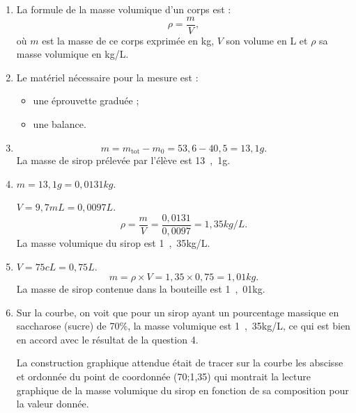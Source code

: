 \begin{enumerate}
\item La formule de la masse volumique d'un corps est :
\begin{equation}
\rho = \frac{m}{V},
\nonumber
\end{equation}
où $m$ est la masse de ce corps exprimée en kg, $V$ son volume en L et $\rho$ sa masse volumique en kg/L.
\item Le matériel nécessaire pour la mesure est :
\begin{itemize}
\item une éprouvette graduée ;
\item une balance.
\end{itemize}
\item
\begin{equation}
m = m_\mathrm{tot} - m_0 = 53{,}6 - 40{,}5 = \unit{13{,}1}{g}.
\nonumber
\end{equation}
La masse de sirop prélevée par l'élève est \unit{13{,}1}{g}.
\item $m = \unit{13{,}1}{g} = \unit{0{,}0131}{kg}.$

$V = \unit{9{,}7}{mL} = \unit{0{,}0097}{L}.$
\begin{equation}
\rho = \frac{m}{V} = \frac{0{,}0131}{0{,}0097} = \unit{1{,}35}{kg/L}.
\nonumber
\end{equation}
La masse volumique du sirop est \unit{1{,}35}{kg/L}.
\item
$V = \unit{75}{cL} = \unit{0{,}75}{L}.$
\begin{equation}
m = \rho \times V = 1{,}35 \times 0{,}75 = \unit{1{,}01}{kg}.
\nonumber
\end{equation}
La masse de sirop contenue dans la bouteille est \unit{1{,}01}{kg}.
\item Sur la courbe, on voit que pour un sirop ayant un pourcentage massique en saccharose (sucre) de \unit{70}{\%}, la masse volumique est \unit{1{,}35}{kg/L}, ce qui est bien en accord avec le résultat de la question 4.

La construction graphique attendue était de tracer sur la courbe les abscisse et ordonnée du point de coordonnée (70;1{,}35) qui montrait la lecture graphique de la masse volumique du sirop en fonction de sa composition pour la valeur donnée.
\end{enumerate}

